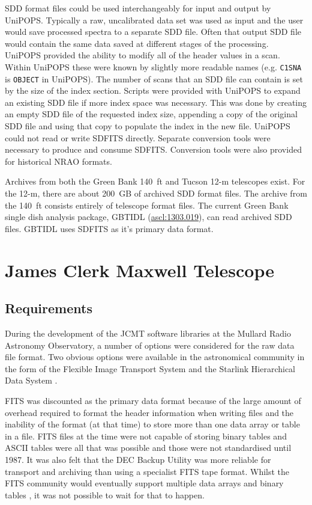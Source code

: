 \documentclass[final,authoryear,5p,times,twocolumn]{elsarticle}
\newcommand{\ascl}[1]{\href{http://www.ascl.net/#1}{ascl:#1}}
\begin{document}
SDD format files could be used interchangeably for input and output by
UniPOPS.  Typically a raw, uncalibrated data set was used as input and
the user would save processed spectra to a separate SDD file.  Often
that output SDD file would contain the same data saved at different
stages of the processing.  UniPOPS provided the ability to modify all
of the header values in a scan.  Within UniPOPS these were known by
slightly more readable names (e.g. \texttt{C1SNA} is \texttt{OBJECT}
in UniPOPS). The number of scans that an SDD file can contain is set
by the size of the index section.  Scripts were provided with UniPOPS
to expand an existing SDD file if more index space was necessary.
This was done by creating an empty SDD file of the requested index
size, appending a copy of the original SDD file and using that copy to
populate the index in the new file.  UniPOPS could not read or write
SDFITS directly. Separate conversion tools were necessary to produce
and consume SDFITS.  Conversion tools were also provided for
historical NRAO formats.

Archives from both the Green Bank 140\, ft and Tucson 12-m telescopes
exist.  For the 12-m, there are about 200\, GB of archived SDD format
files.  The archive from the 140\, ft consists entirely of telescope
format files.  The current Green Bank single dish analysis package,
GBTIDL (\ascl{1303.019}), can read archived SDD files.  GBTIDL uses
SDFITS as it's primary data format.

\section{James Clerk Maxwell Telescope}

\subsection{Requirements}

During the development of the JCMT software libraries at the Mullard
Radio Astronomy Observatory, a number of options were considered for
the raw data file format.  Two obvious options were available in the
astronomical community in the form of the Flexible Image Transport System
\citep[FITS;][]{1981A&AS...44..363W} and the Starlink Hierarchical
Data System \citep[HDS;][\ascl{1502.009}]{1982QJRAS..23..485D,2015HDS}.

FITS was discounted as the primary data format because of the large
amount of overhead required to format the header information when
writing files and the inability of the format (at that time) to store
more than one data array or table in a file. FITS files at the time
were not capable of storing binary tables and ASCII tables were all
that was possible \citep{1988A&AS...73..365H} and those were not
standardised until 1987. It was also felt that the DEC Backup Utility
was more reliable for transport and archiving than using a specialist
FITS tape format. Whilst the FITS community would eventually support
multiple data arrays \citep{1988A&AS...73..359G} and binary tables
\citep{1995A&AS..113..159C}, it was not possible to wait for that to
happen.
\end{document}
